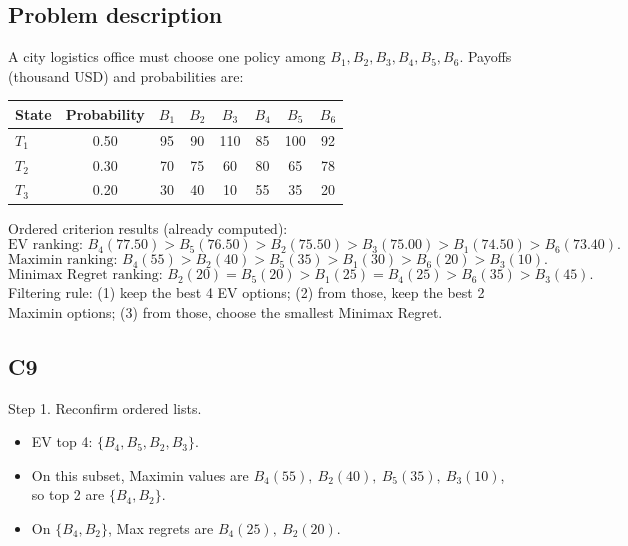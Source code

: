 	\begin{ExamProblems}
		\item
		\subsection*{Problem description}
		A city logistics office must choose one policy among $B_1,B_2,B_3,B_4,B_5,B_6$.
		Payoffs (thousand USD) and probabilities are:
		\begin{center}
			\begin{tabular}{l c c c c c c c}
				\toprule
				State & Probability & $B_1$ & $B_2$ & $B_3$ & $B_4$ & $B_5$ & $B_6$ \\
				\midrule
				$T_1$ & 0.50 & 95 & 90 & 110 & 85 & 100 & 92 \\
				$T_2$ & 0.30 & 70 & 75 & 60 & 80 & 65 & 78 \\
				$T_3$ & 0.20 & 30 & 40 & 10 & 55 & 35 & 20 \\
				\bottomrule
			\end{tabular}
		\end{center}
		Ordered criterion results (already computed):
		\[
		\text{EV ranking: }B_4(77.50)>B_5(76.50)>B_2(75.50)>B_3(75.00)>B_1(74.50)>B_6(73.40).
		\]
		\[
		\text{Maximin ranking: }B_4(55)>B_2(40)>B_5(35)>B_1(30)>B_6(20)>B_3(10).
		\]
		\[
		\text{Minimax Regret ranking: }B_2(20)=B_5(20)>B_1(25)=B_4(25)>B_6(35)>B_3(45).
		\]
		Filtering rule:
		(1) keep the best 4 EV options;
		(2) from those, keep the best 2 Maximin options;
		(3) from those, choose the smallest Minimax Regret.

		\subsection*{C9}
		Step 1. Reconfirm ordered lists.
		\begin{itemize}
			\item EV top 4: $\{B_4,B_5,B_2,B_3\}$.
			\item On this subset, Maximin values are $B_4(55),\ B_2(40),\ B_5(35),\ B_3(10)$, so top 2 are $\{B_4,B_2\}$.
			\item On $\{B_4,B_2\}$, Max regrets are $B_4(25),\ B_2(20)$.
		\end{itemize}


\end{ExamProblems}
